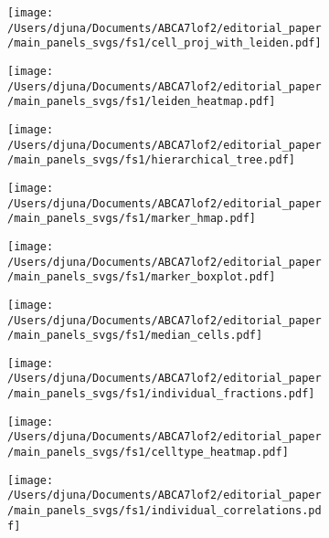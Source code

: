 \documentclass[12pt]{article}
\begin{document}
\begin{figure}[H]
    \begin{subfigure}[t]{.2\textwidth}
        \caption{}
        \texttt{[image: /Users/djuna/Documents/ABCA7lof2/editorial\_paper/main\_panels\_svgs/fs1/cell\_proj\_with\_leiden.pdf]}        
    \end{subfigure}
    \begin{subfigure}[t]{.2\textwidth}
        \caption{}
        \texttt{[image: /Users/djuna/Documents/ABCA7lof2/editorial\_paper/main\_panels\_svgs/fs1/leiden\_heatmap.pdf]}        
    \end{subfigure}   
    \begin{subfigure}[t]{.2\textwidth}
        \caption{}
        \texttt{[image: /Users/djuna/Documents/ABCA7lof2/editorial\_paper/main\_panels\_svgs/fs1/hierarchical\_tree.pdf]}        
    \end{subfigure}  
    \begin{subfigure}[t]{.3\textwidth}
        \caption{}
        \texttt{[image: /Users/djuna/Documents/ABCA7lof2/editorial\_paper/main\_panels\_svgs/fs1/marker\_hmap.pdf]}        
    \end{subfigure}  
    \begin{subfigure}[t]{.8\textwidth}
        \caption{}
        \texttt{[image: /Users/djuna/Documents/ABCA7lof2/editorial\_paper/main\_panels\_svgs/fs1/marker\_boxplot.pdf]}        
    \end{subfigure}    
    \begin{subfigure}[t]{.2\textwidth}
        \caption{}
        \texttt{[image: /Users/djuna/Documents/ABCA7lof2/editorial\_paper/main\_panels\_svgs/fs1/median\_cells.pdf]}        
    \end{subfigure} 
    \begin{subfigure}[t]{.8\textwidth}
        \caption{}
        \texttt{[image: /Users/djuna/Documents/ABCA7lof2/editorial\_paper/main\_panels\_svgs/fs1/individual\_fractions.pdf]}        
    \end{subfigure}  
    \begin{subfigure}[t]{.4\textwidth}
        \caption{}
        \texttt{[image: /Users/djuna/Documents/ABCA7lof2/editorial\_paper/main\_panels\_svgs/fs1/celltype\_heatmap.pdf]}        
    \end{subfigure}  
    \begin{subfigure}[t]{.2\textwidth}
        \caption{}
        \texttt{[image: /Users/djuna/Documents/ABCA7lof2/editorial\_paper/main\_panels\_svgs/fs1/individual\_correlations.pdf]}        
    \end{subfigure}
    \end{figure}
\end{document}
